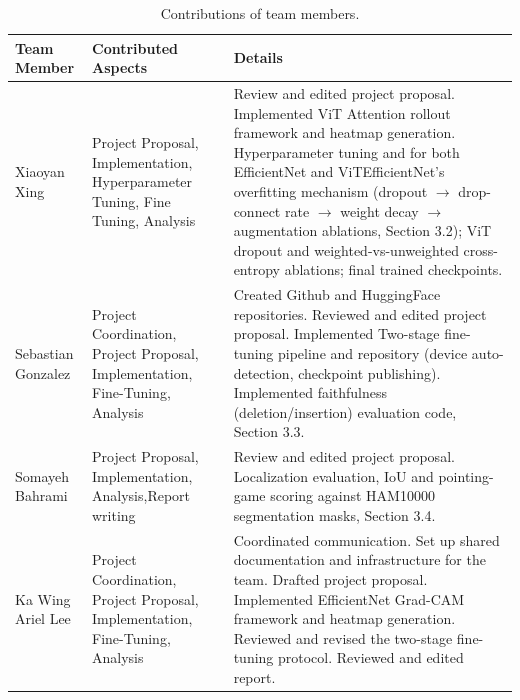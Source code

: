 \documentclass[10pt,twocolumn,letterpaper]{article}
\begin{document}
\begin{table}[t]
\begin{center}
\begin{tabular}{|p{3cm}|p{5cm}|p{8cm}|}
\hline
Team Member & Contributed Aspects & Details \\
\hline\hline
Xiaoyan Xing & Project Proposal, Implementation, Hyperparameter Tuning, Fine Tuning, Analysis & Review and edited project proposal. Implemented ViT Attention rollout framework and heatmap generation. Hyperparameter tuning and for both EfficientNet and ViTEfficientNet's overfitting mechanism (dropout $\rightarrow$ drop-connect rate $\rightarrow$ weight decay $\rightarrow$ augmentation ablations, Section 3.2); ViT dropout and weighted-vs-unweighted cross-entropy ablations; final trained checkpoints. \\
\hline
Sebastian Gonzalez & Project Coordination, Project Proposal, Implementation, Fine-Tuning, Analysis & Created Github and HuggingFace repositories. Reviewed and edited project proposal. Implemented Two-stage fine-tuning pipeline and repository (device auto-detection, checkpoint publishing). Implemented faithfulness (deletion/insertion) evaluation code, Section 3.3. \\
\hline
Somayeh Bahrami & Project Proposal, Implementation, Analysis,Report writing & Review and edited project proposal. Localization evaluation, IoU and pointing-game scoring against HAM10000 segmentation masks, Section 3.4.\\
\hline
Ka Wing Ariel Lee & Project Coordination, Project Proposal, Implementation, Fine-Tuning, Analysis & Coordinated communication. Set up shared documentation and infrastructure for the team. Drafted project proposal. Implemented EfficientNet Grad-CAM framework and heatmap generation. Reviewed and revised the two-stage fine-tuning protocol. Reviewed and edited report.\\
\hline
\end{tabular}
\end{center}
\caption{Contributions of team members.}
\label{tab:contributions}
\end{table}


\end{document}
